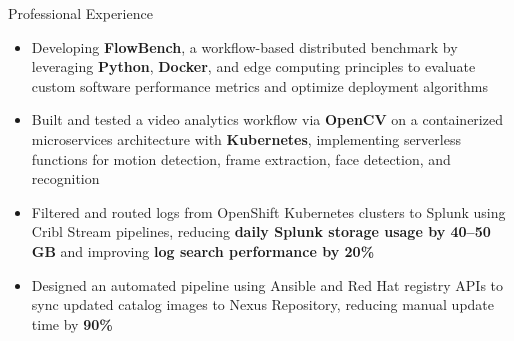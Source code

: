 \documentclass{resume}
\begin{document}
 \begin{experienceSection}{Professional Experience}
    \experienceItem[
        company={Arizona State University},
        location={Tempe, AZ},
        position={Research Assistant, VISA Lab},
        duration={Jun 2025 - Present}
    ]
    \begin{itemize}
        \itemsep -6pt {}
        \item Developing \textbf{FlowBench}, a workflow-based distributed benchmark by leveraging \textbf{Python}, \textbf{Docker}, and edge computing principles to evaluate custom software performance metrics and optimize deployment algorithms
        \item Built and tested a video analytics workflow via \textbf{OpenCV} on a containerized microservices architecture with \textbf{Kubernetes}, implementing serverless functions for motion detection, frame extraction, face detection, and recognition
    \end{itemize}

    \experienceItem[
        company={Arch Mortgage Insurance},
        location={Greensboro, NC},
        position={Site Reliability Engineer Intern},
        duration={Jun 2024 - Aug 2024}
    ]
    \begin{itemize}
        \itemsep -6pt {}
        \item Filtered and routed logs from OpenShift Kubernetes clusters to Splunk using Cribl Stream pipelines, reducing \textbf{daily Splunk storage usage by 40–50 GB} and improving \textbf{log search performance by 20\%}
        \item Designed an automated pipeline using Ansible and Red Hat registry APIs to sync updated catalog images to Nexus Repository, reducing manual update time by\textbf{ 90\%}
        
    \end{itemize}


\end{experienceSection}
\end{document}
